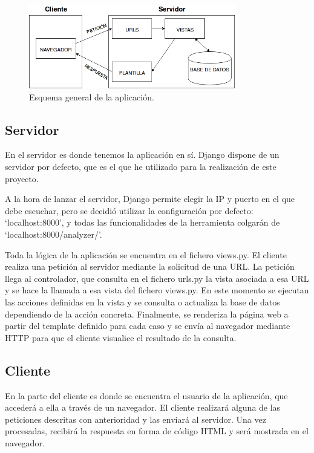 \documentclass[a4paper, 12pt]{book}
\begin{document}
\begin{figure}[H]
  \centering
  \includegraphics[width=9cm, keepaspectratio]{img/arqSistema}
  \caption{Esquema general de la aplicación.}
  \label{fig:arqSistema}
\end{figure}

\subsection{Servidor}
\label{sec:seccion11.1}
En el servidor es donde tenemos la aplicación en sí. Django dispone de un servidor por defecto, que es el que he utilizado para la realización de este proyecto.

A la hora de lanzar el servidor, Django permite elegir la IP y puerto en el que debe escuchar, pero se decidió utilizar la configuración por defecto: `localhost:8000', y todas las funcionalidades de la herramienta colgarán de `localhost:8000/analyzer/'.

Toda la lógica de la aplicación se encuentra en el fichero views.py. El cliente realiza una petición al servidor mediante la solicitud de una URL. La petición llega al controlador, que consulta en el fichero urls.py la vista asociada a esa URL y se hace la llamada a esa vista del fichero views.py. En este momento se ejecutan las acciones definidas en la vista y se consulta o actualiza la base de datos dependiendo de la acción concreta. Finalmente, se renderiza la página web a partir del template definido para cada caso y se envía al navegador mediante HTTP para que el cliente visualice el resultado de la consulta.


\subsection{Cliente}
\label{sec:seccion11.2}
En la parte del cliente es donde se encuentra el usuario de la aplicación, que accederá a ella a través de un navegador. El cliente realizará alguna de las peticiones descritas con anterioridad y las enviará al servidor. Una vez procesadas, recibirá la respuesta en forma de código HTML y será mostrada en el navegador.
\end{document}
